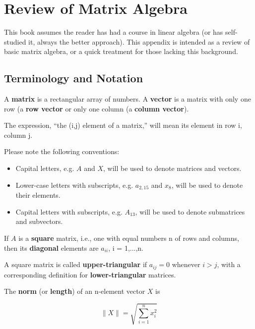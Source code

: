 \chapter{Review of Matrix Algebra}
\label{chap:matrixreview}

This book assumes the reader has had a course in linear algebra (or has
self-studied it, always the better approach).  This appendix is intended
as a review of basic matrix algebra, or a quick treatment for those
lacking this background.

\section{Terminology and Notation}

A {\bf matrix} is a rectangular array of numbers.  A {\bf vector} is a
matrix with only one row (a {\bf row vector} or only one column (a {\bf
column vector}).

The expression, ``the (i,j) element of a matrix,'' will mean its element
in row i, column j.

Please note the following conventions:

\begin{itemize}

\item Capital letters, e.g. $A$ and $X$, will be used to denote matrices and
vectors.  

\item Lower-case letters with subscripts, e.g. $a_{2,15}$ and $x_8$,
will be used to denote their elements.

\item Capital letters with subscripts, e.g. $A_{13}$, will be used to
denote submatrices and subvectors.

\end{itemize}

If $A$ is a {\bf square} matrix, i.e., one with equal numbers n of rows and
columns, then its {\bf diagonal} elements are $a_{ii}$, i = 1,...,n.

A square matrix is called {\bf upper-triangular} if $a_{ij} = 0$
whenever $i > j$, with a corresponding definition for {\bf
lower-triangular} matrices.

The {\bf norm} (or {\bf length}) of an n-element vector $X$ is 

\begin{equation}
\parallel{X} \parallel = \sqrt{\sum_{i=1}^n x_i^2}
\end{equation}

